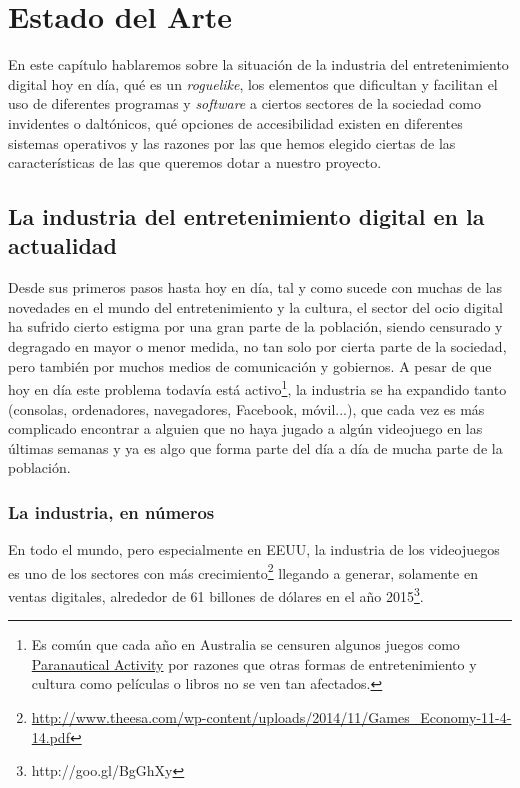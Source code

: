 \chapter{Estado del Arte}

En este capítulo hablaremos sobre la situación de la industria del entretenimiento digital hoy en día, qué es un \textit{roguelike}, los elementos que dificultan y facilitan el uso de diferentes programas y \textit{software} a ciertos sectores de la sociedad como invidentes o daltónicos, qué opciones de accesibilidad existen en diferentes sistemas operativos y las razones por las que hemos elegido ciertas de las características de las que queremos dotar a nuestro proyecto.

\section{La industria del entretenimiento digital en la actualidad}

Desde sus primeros pasos hasta hoy en día, tal y como sucede con muchas de las novedades en el mundo del entretenimiento y la cultura, el sector del ocio digital ha sufrido cierto estigma por una gran parte de la población, siendo censurado y degragado en mayor o menor medida, no tan solo por cierta parte de la sociedad, pero también por muchos medios de comunicación y gobiernos. A pesar de que hoy en día este problema todavía está activo\footnote{Es común que cada año en Australia se censuren algunos juegos como \href{http://goo.gl/hFrQah}{Paranautical Activity} por razones que otras formas de entretenimiento y cultura como películas o libros no se ven tan afectados.}, la industria se ha expandido tanto (consolas, ordenadores, navegadores, Facebook, móvil...), que cada vez es más complicado encontrar a alguien que no haya jugado a algún videojuego en las últimas semanas y ya es algo que forma parte del día a día de mucha parte de la población.

\subsection{La industria, en números}
En todo el mundo, pero especialmente en EEUU, la industria de los videojuegos es uno de los sectores con más crecimiento\footnote{\url{http://www.theesa.com/wp-content/uploads/2014/11/Games_Economy-11-4-14.pdf}} llegando a generar, solamente en ventas digitales, alrededor de 61 billones de dólares en el año 2015\footnote{http://goo.gl/BgGhXy}.

